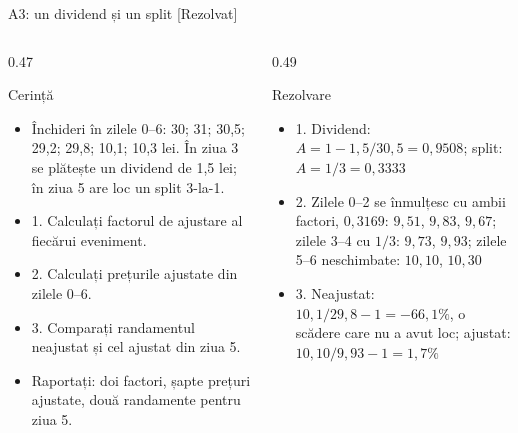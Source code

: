 \begin{frame}{A3: un dividend și un split [Rezolvat]}
\itemsize{\footnotesize}
\begin{columns}[T]
\begin{column}{0.47\textwidth}
\begin{block}{Cerință}
\begin{itemize}
    \item Închideri în zilele 0--6: 30; 31; 30,5; 29,2; 29,8; 10,1; 10,3 lei. În ziua 3 se plătește un dividend de 1,5 lei; în ziua 5 are loc un split 3-la-1.
    \item 1. Calculați factorul de ajustare al fiecărui eveniment.
    \item 2. Calculați prețurile ajustate din zilele 0--6.
    \item 3. Comparați randamentul neajustat și cel ajustat din ziua 5.
    \item Raportați: doi factori, șapte prețuri ajustate, două randamente pentru ziua 5.
\end{itemize}
\end{block}
\end{column}
\begin{column}{0.49\textwidth}
\begin{exampleblock}{Rezolvare}
\begin{itemize}
    \item 1. Dividend: $A = 1 - 1{,}5/30{,}5 = 0{,}9508$; split: $A = 1/3 = 0{,}3333$
    \item 2. Zilele 0--2 se înmulțesc cu ambii factori, $0{,}3169$: $9{,}51$, $9{,}83$, $9{,}67$; zilele 3--4 cu $1/3$: $9{,}73$, $9{,}93$; zilele 5--6 neschimbate: $10{,}10$, $10{,}30$
    \item 3. Neajustat: $10{,}1/29{,}8 - 1 = -66{,}1\%$, o scădere care nu a avut loc; ajustat: $10{,}10/9{,}93 - 1 = 1{,}7\%$
\end{itemize}
\end{exampleblock}
\end{column}
\end{columns}
\end{frame}

